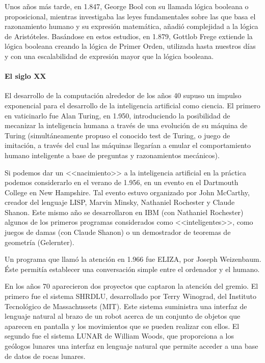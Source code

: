 \documentclass[a4paper, 11pt, titlepage]{article}
\begin{document}
    Unos años más tarde, en 1.847, George Bool con su llamada lógica booleana o proposicional, mientras 
    investigaba las leyes fundamentales sobre las que basa el razonamiento humano y su expresión matemática, 
    añadió complejidad a la lógica de Aristóteles. Basándose en estos estudios, en 1.879, Gottlob Frege extiende 
    la lógica booleana creando la lógica de Primer Orden, utilizada hasta nuestros días y con una escalabilidad 
    de expresión mayor que la lógica booleana.

    \paragraph{El siglo XX} El desarrollo de la computación alrededor de los años 40 supuso un impulso exponencial 
    para el desarrollo de la inteligencia artificial como ciencia. El primero en vaticinarlo fue Alan Turing, en
    1.950, introduciendo la posibilidad de mecanizar la inteligencia humana a través de una evolución de su máquina 
    de Turing (simultáneamente propuso el conocido test de Turing, o juego de imitación, a través del cual las 
    máquinas llegarían a emular el comportamiento humano inteligente a base de preguntas y razonamientos mecánicos).

    Si podemos dar un <<nacimiento>> a la inteligencia artificial en la práctica podemos considerarlo en el verano 
    de 1.956, en un evento en el Dartmouth College en New Hampshire. Tal evento estuvo organizado por John McCarthy, 
    creador del lenguaje LISP, Marvin Minsky, Nathaniel Rochester y Claude Shanon. Este mismo año se desarrollaron en 
    IBM (con Nathaniel Rochester) algunos de los primeros programas considerados como <<inteligentes>>, como juegos 
    de damas (con Claude Shanon) o un demostrador de teoremas de geometría (Gelernter).

    Un programa que llamó la atención en 1.966 fue ELIZA, por Joseph Weizenbaum. Éste permitía establecer una 
    conversación simple entre el ordenador y el humano.

    En los años 70 aparecieron dos proyectos que captaron la atención del gremio. El primero fue el sistema SHRDLU, 
    desarrollado por Terry Winograd, del Instituto Tecnológico de Massachussets (MIT). Este sistema suministra 
    una interfaz de lenguaje natural al brazo de un robot acerca de un conjunto de objetos que aparecen en pantalla y 
    los movimientos que se pueden realizar con ellos. El segundo fue el sistema LUNAR de William Woods, que proporciona 
    a los geólogos lunares una interfaz en lenguaje natural que permite acceder a una base de datos de rocas lunares. 
\end{document}
